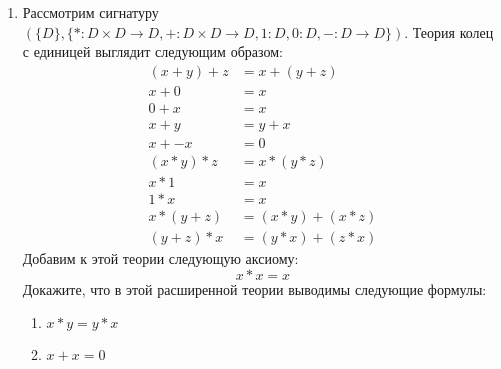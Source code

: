 \begin{enumerate}
\item Рассмотрим сигнатуру $(\{D\}, \{ * : D \times D \to D, + : D \times D \to D, 1 : D, 0 : D, - : D \to D \})$.
    Теория колец с единицей выглядит следующим образом:
\begin{align*}
(x + y) + z & = x + (y + z) \\
x + 0 & = x \\
0 + x & = x \\
x + y & = y + x \\
x + -x & = 0 \\
(x * y) * z & = x * (y * z) \\
x * 1 & = x \\
1 * x & = x \\
x * (y + z) & = (x * y) + (x * z) \\
(y + z) * x & = (y * x) + (z * x)
\end{align*}
Добавим к этой теории следующую аксиому:
\[ x * x = x \]
Докажите, что в этой расширенной теории выводимы следующие формулы:
\begin{enumerate}
\item $x * y = y * x$
\item $x + x = 0$
\end{enumerate}

\end{enumerate}

